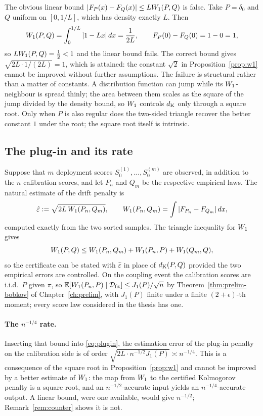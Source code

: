 \documentclass[../../../main.tex]{subfiles}
\begin{document}
\begin{remark}\label{rem:counter}
The obvious linear bound $|F_P(x)-F_Q(x)|\le LW_1(P,Q)$ is false. Take $P=\delta_0$ and $Q$ uniform on $[0,1/L]$, which has density exactly $L$. Then
\[
W_1(P,Q)=\int_0^{1/L}|1-Lx|\,dx=\frac1{2L},\qquad F_P(0)-F_Q(0)=1-0=1,
\]
so $LW_1(P,Q)=\tfrac12<1$ and the linear bound fails. The correct bound gives $\sqrt{2L\cdot1/(2L)}=1$, which is attained: the constant $\sqrt2$ in Proposition~\ref{prop:w1} cannot be improved without further assumptions. The failure is structural rather than a matter of constants. A distribution function can jump while its $W_1$-neighbour is spread thinly; the area between them scales as the square of the jump divided by the density bound, so $W_1$ controls $d_{\mathrm{K}}$ only through a square root. Only when $P$ is also regular does the two-sided triangle recover the better constant $1$ under the root; the square root itself is intrinsic.
\end{remark}

\subsection{The plug-in and its rate}

Suppose that $m$ deployment scores $S_0^{(1)},\dots,S_0^{(m)}$ are observed, in addition to the $n$ calibration scores, and let $P_n$ and $Q_m$ be the respective empirical laws. The natural estimate of the drift penalty is
\begin{equation}\label{eq:plugin}
\hat\varepsilon:=\sqrt{2L\,W_1(P_n,Q_m)},\qquad W_1(P_n,Q_m)=\int|F_{P_n}-F_{Q_m}|\,dx,
\end{equation}
computed exactly from the two sorted samples. The triangle inequality for $W_1$ gives
\[
W_1(P,Q)\le W_1(P_n,Q_m)+W_1(P_n,P)+W_1(Q_m,Q),
\]
so the certificate can be stated with $\hat\varepsilon$ in place of $d_{\mathrm{K}}(P,Q)$ provided the two empirical errors are controlled. On the coupling event the calibration scores are i.i.d.\ $P$ given $\pi$, so $\mathbb{E}[W_1(P_n,P)\mid\mathcal D_{\mathrm{fit}}]\le J_1(P)/\sqrt n$ by Theorem~\ref{thm:prelim-bobkov} of Chapter~\ref{ch:prelim}, with $J_1(P)$ finite under a finite $(2+\epsilon)$-th moment; every score law considered in the thesis has one.

\paragraph{The $n^{-1/4}$ rate.} Inserting that bound into \eqref{eq:plugin}, the estimation error of the plug-in penalty on the calibration side is of order $\sqrt{2L\cdot n^{-1/2}J_1(P)}\asymp n^{-1/4}$. This is a consequence of the square root in Proposition~\ref{prop:w1} and cannot be improved by a better estimate of $W_1$: the map from $W_1$ to the certified Kolmogorov penalty is a square root, and an $n^{-1/2}$-accurate input yields an $n^{-1/4}$-accurate output. A linear bound, were one available, would give $n^{-1/2}$; Remark~\ref{rem:counter} shows it is not.
\end{document}
